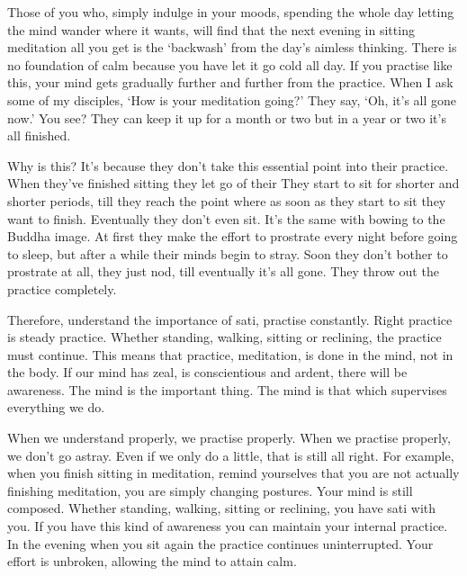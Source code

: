 Those of you who, simply indulge in your moods, spending the whole day letting the mind wander where it wants, will find that the next evening in sitting meditation all you get is the `backwash' from the day's aimless thinking. There is no foundation of calm because you have let it go cold all day. If you practise like this, your mind gets gradually further and further from the practice. When I ask some of my disciples, `How is your meditation going?' They say, `Oh, it's all gone now.' You see? They can keep it up for a month or two but in a year or two it's all finished.

Why is this? It's because they don't take this essential point into their practice. When they've finished sitting they let go of their  They start to sit for shorter and shorter periods, till they reach the point where as soon as they start to sit they want to finish. Eventually they don't even sit. It's the same with bowing to the Buddha image. At first they make the effort to prostrate every night before going to sleep, but after a while their minds begin to stray. Soon they don't bother to prostrate at all, they just nod, till eventually it's all gone. They throw out the practice completely.

Therefore, understand the importance of sati, practise constantly. Right practice is steady practice. Whether standing, walking, sitting or reclining, the practice must continue. This means that practice, meditation, is done in the mind, not in the body. If our mind has zeal, is conscientious and ardent, there will be awareness. The mind is the important thing. The mind is that which supervises everything we do.

When we understand properly, we practise properly. When we practise properly, we don't go astray. Even if we only do a little, that is still all right. For example, when you finish sitting in meditation, remind yourselves that you are not actually finishing meditation, you are simply changing postures. Your mind is still composed. Whether standing, walking, sitting or reclining, you have sati with you. If you have this kind of awareness you can maintain your internal practice. In the evening when you sit again the practice continues uninterrupted. Your effort is unbroken, allowing the mind to attain calm.

